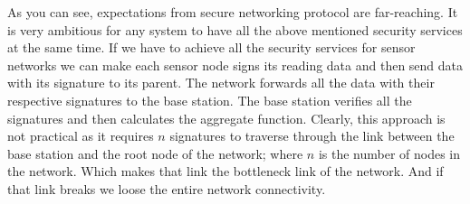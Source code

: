 



	As you can see, expectations from secure networking protocol are far-reaching.
	It is very ambitious for any system to have all the above mentioned security services at the same time.
	If we have to achieve all the security services for sensor networks we can make each sensor node signs its reading data and then send data with its signature to its parent.
	The network forwards all the data with their respective signatures to the base station.
	The base station verifies all the signatures and then calculates the aggregate function.
	Clearly, this approach is not practical as it requires $n$ signatures to traverse through the link between the base station and the root node of the network; where $n$ is the number of nodes in the network.
	Which makes that link the bottleneck link of the network. 
	And if that link breaks we loose the entire network connectivity.

